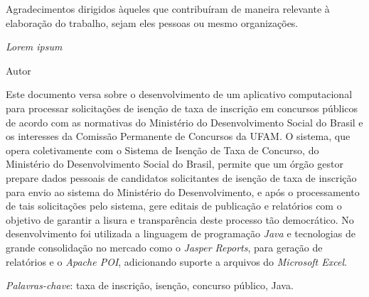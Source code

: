 \documentclass[
	12pt,			%
	openright,		%
	oneside,	
	a4paper,		%
	english,		%
	brazil			%
]{abntex2/abntex2}  %
\begin{document}
\begin{agradecimentos}

Agradecimentos dirigidos àqueles que contribuíram de maneira relevante à elaboração do trabalho, sejam eles pessoas ou mesmo organizações.

\end{agradecimentos}

\begin{epigrafe}
    \vspace*{\fill}
	\begin{flushright}
		\textit{Lorem ipsum}

		Autor
	\end{flushright}\vspace{4cm}
\end{epigrafe}


\setlength{\absparsep}{18pt} %
\begin{resumo}

	Este documento versa sobre o desenvolvimento de um aplicativo computacional para processar solicitações de isenção de taxa de inscrição em concursos públicos de acordo com as normativas do Ministério do Desenvolvimento Social do Brasil e os interesses da Comissão Permanente de Concursos da UFAM. O sistema, que opera coletivamente com o Sistema de Isenção de Taxa de Concurso, do Ministério do Desenvolvimento Social do Brasil, permite que um órgão gestor prepare dados pessoais de candidatos solicitantes de isenção de taxa de inscrição para envio ao sistema do Ministério do Desenvolvimento, e após o processamento de tais solicitações pelo sistema, gere editais de publicação e relatórios com o objetivo de garantir a lisura e transparência deste processo tão democrático. No desenvolvimento foi utilizada a linguagem de programação \textit{Java} e tecnologias de grande consolidação no mercado como o \textit{Jasper Reports}, para geração de relatórios e o \textit{Apache POI}, adicionando suporte a arquivos do \textit{Microsoft Excel}.

	\vspace{\onelineskip}

	\noindent
	\textit{Palavras-chave}: taxa de inscrição, isenção, concurso público, Java.

\end{resumo}
\end{document}
